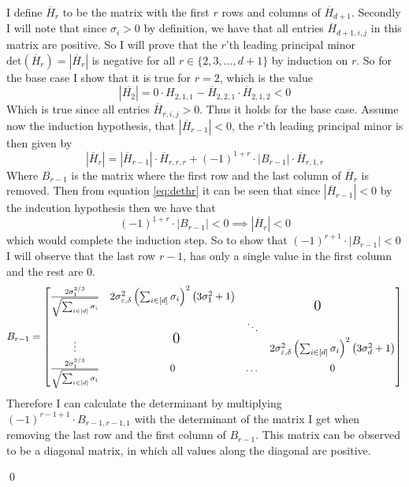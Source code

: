 \documentclass[a4paper,12pt]{article}
\renewenvironment{proof}{{\textit{Proof} \\}}{\qed}
\begin{document}
\begin{proof}
I define $\overline{H}_{r}$ to be the matrix with the first $r$ rows and columns of $\overline{H}_{d+1}$. 
Secondly I will note that since $\sigma_i > 0$ by definition, we have that all entries $\overline{H}_{d+1,i,j}$ 
in this matrix are positive.
So I will prove that the $r$'th leading principal minor 
$\text{det}(\overline{H}_{r}) = |\overline{H}_{r}|$ is negative for all $r \in \{2,3,\dots,d+1\}$ by induction on $r$.
So for the base case I show that it is true for $r=2$, which is the value
\[
    |\overline{H_2}| = 0 \cdot H_{2,1,1} - \overline{H}_{2,2,1} \cdot \overline{H}_{2,1,2} < 0 
\]
Which is true since all entries $\overline{H}_{r,i,j} > 0$. Thus it holds for the base case.
Assume now the induction hypothesis, that $|\overline{H}_{r-1}| < 0$, the $r$'th leading principal minor is 
then given by
\begin{equation}
\label{eq:dethr}
|\overline{H}_{r}| = |\overline{H}_{r-1}| \cdot \overline{H}_{r,r,r} + (-1)^{1 + r} \cdot |B_{r-1}| \cdot \overline{H}_{r,1,r}
\end{equation}
Where $B_{r-1}$ is the matrix where the first row and the last column of $\overline{H}_{r}$ is removed.
Then from equation \eqref{eq:dethr} it can be seen that since $|\overline{H}_{r-1}| < 0$ by the indcution hypothesis
then we have that 
\begin{equation}
\label{eq:inducstep}
(-1)^{1+r} \cdot |B_{r-1}| < 0 \implies |\overline{H}_{r}| < 0
\end{equation}
which would complete the induction step.
So to show that $(-1)^{r+1} \cdot |B_{r-1}| < 0$ I will observe that the last row $r-1$, has only a single value in the first column
and the rest are $0$.
\[
    B_{r-1} =
    \begin{bmatrix}
    \frac{2\sigma_1^{2/3}}{\sqrt{\sum_{i \in [d]} \sigma_i}} & 2\sigma_{\epsilon, \delta}^2 \lr{\sum_{i \in [d]} \sigma_i}^2 \lr{3\sigma_1^2 + 1} &  & \multirow{2.5}{0.5in}{\Large 0}  \\
    & \multirow{2.5}{-0.5in}{\Large 0}  & \ddots \\
    \vdots &  & & 2\sigma_{\epsilon, \delta}^2 \lr{\sum_{i \in [d]} \sigma_i}^2 \lr{3\sigma_d^2 + 1} \\
    \frac{2\sigma_1^{2/3}}{\sqrt{\sum_{i \in [d]} \sigma_i}} & 0 & \dots &  0
    \end{bmatrix}
\]
Therefore I can calculate the determinant by multiplying $(-1)^{r-1 + 1} \cdot B_{r-1,r-1,1}$ with the determinant
of the matrix I get when removing the last row and the first column of $B_{r-1}$.
This matrix can be observed to be a diagonal matrix, in which all values along the diagonal are positive.

\end{proof}
\end{document}
